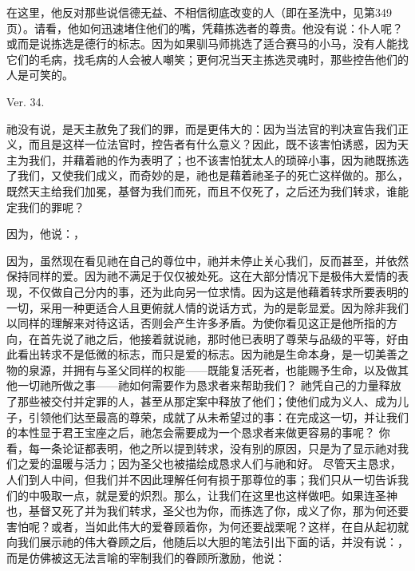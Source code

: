 在这里，他反对那些说信德无益、不相信彻底改变的人（即在圣洗中，见第349页）。请看，他如何迅速堵住他们的嘴，凭藉拣选者的尊贵。他没有说：仆人呢？或而是说拣选是德行的标志。因为如果驯马师挑选了适合赛马的小马，没有人能找它们的毛病，找毛病的人会被人嘲笑；更何况当天主拣选灵魂时，那些控告他们的人是可笑的。\par

\par

Ver. 34. \par

祂没有说，是天主赦免了我们的罪，而是更伟大的：因为当法官的判决宣告我们正义，而且是这样一位法官时，控告者有什么意义？因此，既不该害怕诱惑，因为天主为我们，并藉着祂的作为表明了；也不该害怕犹太人的琐碎小事，因为祂既拣选了我们，又使我们成义，而奇妙的是，祂也是藉着祂圣子的死亡这样做的。那么，既然天主给我们加冕，基督为我们而死，而且不仅死了，之后还为我们转求，谁能定我们的罪呢？\par

因为，他说：，\par

因为，虽然现在看见祂在自己的尊位中，祂并未停止关心我们，反而甚至，并依然保持同样的爱。因为祂不满足于仅仅被处死。这在大部分情况下是极伟大爱情的表现，不仅做自己分内的事，还为此向另一位求情。因为这是他藉着转求所要表明的一切，采用一种更适合人且更俯就人情的说话方式，为的是彰显爱。因为除非我们以同样的理解来对待这话，否则会产生许多矛盾。为使你看见这正是他所指的方向，在首先说了祂之后，他接着就说祂，那时他已表明了尊荣与品级的平等，好由此看出转求不是低微的标志，而只是爱的标志。因为祂是生命本身，是一切美善之物的泉源，并拥有与圣父同样的权能——既能复活死者，也能赐予生命，以及做其他一切祂所做之事——祂如何需要作为恳求者来帮助我们？  祂凭自己的力量释放了那些被交付并定罪的人，甚至从那定案中释放了他们；使他们成为义人、成为儿子，引领他们达至最高的尊荣，成就了从未希望过的事：在完成这一切，并让我们的本性显于君王宝座之后，祂怎会需要成为一个恳求者来做更容易的事呢？  你看，每一条论证都表明，他之所以提到转求，没有别的原因，只是为了显示祂对我们之爱的温暖与活力；因为圣父也被描绘成恳求人们与祂和好。  尽管天主恳求，人们到人中间，但我们并不因此理解任何有损于那尊位的事；我们只从一切告诉我们的中吸取一点，就是爱的炽烈。那么，让我们在这里也这样做吧。如果连圣神也，基督又死了并为我们转求，圣父也为你，而拣选了你，成义了你，那为何还要害怕呢？或者，当如此伟大的爱眷顾着你，为何还要战栗呢？这样，在自从起初就向我们展示祂的伟大眷顾之后，他随后以大胆的笔法引出下面的话，并没有说：，而是仿佛被这无法言喻的宰制我们的眷顾所激励，他说：\par

